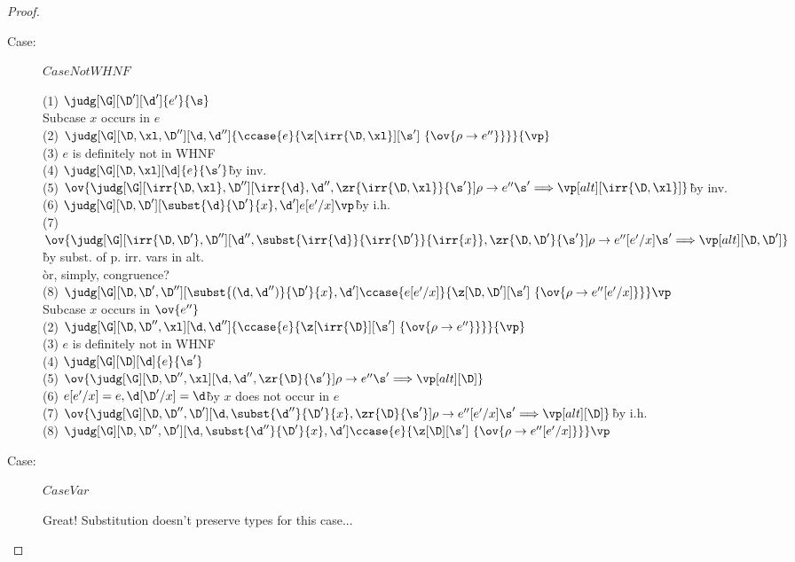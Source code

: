 \begin{proof}
\begin{description}
\item[Case:] $CaseNotWHNF$
\begin{tabbing}
  (1) $\judg[\G][\D'][\d']{e'}{\s}$\\
  Subcase $x$ occurs in $e$\\
    (2) $\judg[\G][\D,\xl,\D''][\d,\d'']{\ccase{e}{\z[\irr{\D,\xl}][\s']~\{\ov{\rho\to e''}\}}}{\vp}$\\
    (3) $e$ is definitely not in WHNF\\
    (4) $\judg[\G][\D,\xl][\d]{e}{\s'}$\`by inv.\\
    (5) $\ov{\judg[\G][\irr{\D,\xl},\D''][\irr{\d},\d'',\zr{\irr{\D,\xl}}{\s'}]{\rho\to e''}{\s' \Longrightarrow \vp}[alt][\irr{\D,\xl}]}$\`by inv.\\
    (6) $\judg[\G][\D,\D'][\subst{\d}{\D'}{x}, \d']{e[e'/x]}{\vp}$\`by i.h.\\
    (7) $\ov{\judg[\G][\irr{\D,\D'},\D''][\d'',\subst{\irr{\d}}{\irr{\D'}}{\irr{x}},\zr{\D,\D'}{\s'}]{\rho\to e''[e'/x]}{\s' \Longrightarrow \vp}[alt][\D,\D']}$\\
    \` by subst. of p. irr. vars in alt.\\
    \` or, simply, congruence?\\
    (8) $\judg[\G][\D,\D',\D''][\subst{(\d,\d'')}{\D'}{x},\d']{\ccase{e[e'/x]}{\z[\D,\D'][\s']~\{\ov{\rho\to e''[e'/x]}\}}}{\vp}$\\
  Subcase $x$ occurs in $\ov{e''}$\\
    (2) $\judg[\G][\D,\D'',\xl][\d,\d'']{\ccase{e}{\z[\irr{\D}][\s']~\{\ov{\rho\to e''}\}}}{\vp}$\\
    (3) $e$ is definitely not in WHNF\\
    (4) $\judg[\G][\D][\d]{e}{\s'}$\\
    (5) $\ov{\judg[\G][\D,\D'',\xl][\d,\d'',\zr{\D}{\s'}]{\rho\to e''}{\s' \Longrightarrow \vp}[alt][\D]}$\\
    (6) $e[e'/x] = e, \d[\D'/x]=\d$\` by $x$ does not occur in $e$\\
    (7) $\ov{\judg[\G][\D,\D'',\D'][\d,\subst{\d''}{\D'}{x},\zr{\D}{\s'}]{\rho\to e''[e'/x]}{\s' \Longrightarrow \vp}[alt][\D]}$\`by i.h.\\
    (8) $\judg[\G][\D,\D'',\D'][\d,\subst{\d''}{\D'}{x},\d']{\ccase{e}{\z[\D][\s']~\{\ov{\rho\to e''[e'/x]}\}}}{\vp}$\\
\end{tabbing}

\item[Case:] $CaseVar$
\begin{tabbing}
    Great! Substitution doesn't preserve types for this case...
\end{tabbing}


\end{description}
\end{proof}

